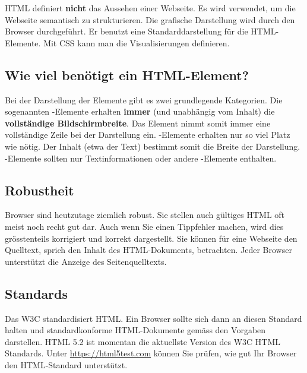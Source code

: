 \begin{important}
	HTML definiert \textbf{nicht} das Aussehen einer Webseite. Es wird verwendet, um die Webseite semantisch zu strukturieren. Die grafische Darstellung wird durch den Browser durchgeführt. Er benutzt eine Standarddarstellung für die \ac{HTML}-Elemente. Mit \ac{CSS} kann man die Visualisierungen definieren.
\end{important}

\subsection{Wie viel \protect{} benötigt ein \ac{HTML}-Element?}

Bei der Darstellung der Elemente gibt es zwei grundlegende Kategorien. Die sogenannten -Elemente erhalten \textbf{immer} (und unabhängig vom Inhalt) die \textbf{vollständige Bildschirmbreite}. Das Element nimmt somit immer eine vollständige Zeile bei der Darstellung ein. -Elemente erhalten nur so viel Platz wie nötig. Der Inhalt (etwa der Text) bestimmt somit die Breite der Darstellung. -Elemente sollten nur Textinformationen oder andere -Elemente enthalten.

\subsection{Robustheit}

Browser sind heutzutage ziemlich robust. Sie stellen auch  gültiges \ac{HTML} oft meist noch recht gut dar. Auch wenn Sie einen Tippfehler machen, wird dies grösstenteils korrigiert und korrekt dargestellt. Sie können für eine Webseite den Quelltext, sprich den Inhalt des \ac{HTML}-Dokuments, betrachten. Jeder Browser unterstützt die Anzeige des Seitenquelltexts.

\subsection{Standards}

Das \ac{W3C} standardisiert \ac{HTML}. Ein Browser sollte sich dann an diesen Standard halten und standardkonforme \ac{HTML}-Dokumente gemäss den Vorgaben darstellen. \ac{HTML} 5.2 ist momentan die aktuellste Version des \ac{W3C} \ac{HTML} Standards. Unter \url{https://html5test.com} können Sie prüfen, wie gut Ihr Browser den \ac{HTML}-Standard unterstützt.